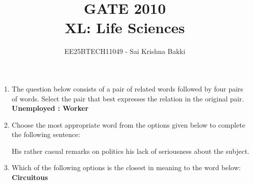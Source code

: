 \documentclass[journal,12pt,onecolumn]{IEEEtran}
\theoremstyle{remark}
\begin{document}
\title{
 GATE 2010 \\
XL: Life Sciences}
\author{EE25BTECH11049 - Sai Krishna Bakki}
\date{}
\maketitle
\begin{enumerate}

\item The question below consists of a pair of related words followed by four pairs of words. 
Select the pair that best expresses the relation in the original pair.  
\textbf{Unemployed : Worker}  

\hfill{}

\begin{enumerate}
\end{enumerate}

\item Choose the most appropriate word from the options given below to complete the following sentence:  

His rather casual remarks on politics \underline{\hspace{2cm}} his lack of seriousness about the subject.  

\hfill{}

\begin{enumerate}
\end{enumerate}

\item Which of the following options is the closest in meaning to the word below: \\ 
\textbf{Circuitous}  

\hfill{}

\begin{enumerate}
\end{enumerate}


\end{enumerate}
\end{document}
